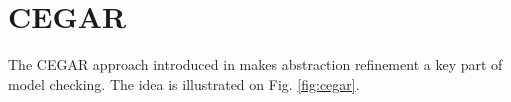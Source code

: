 



\section{CEGAR}



The CEGAR approach introduced in \cite{clarke2003counterexample} makes
abstraction refinement a key part of model checking. The idea is illustrated on
Fig. \ref{fig:cegar}.

